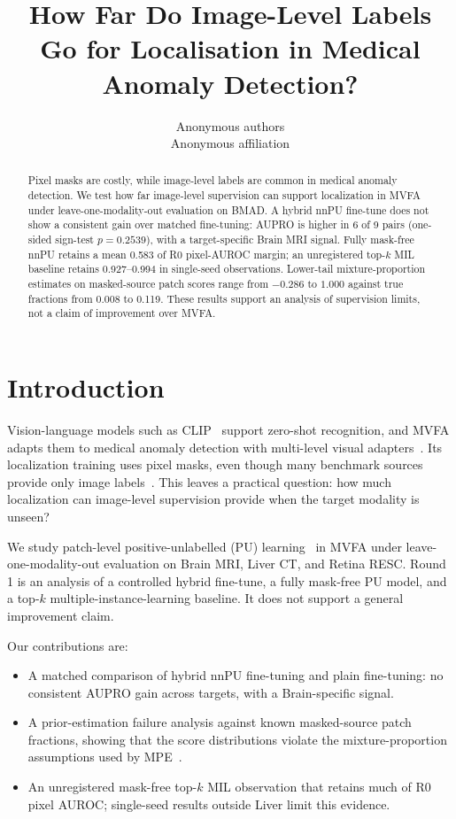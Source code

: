 \documentclass[10pt,twocolumn,letterpaper]{article}
\title{How Far Do Image-Level Labels Go for Localisation in Medical Anomaly Detection?}
\author{Anonymous authors\\Anonymous affiliation}
\begin{document}
\maketitle
\begin{abstract}
Pixel masks are costly, while image-level labels are common in medical anomaly detection. We test how far image-level supervision can support localization in MVFA under leave-one-modality-out evaluation on BMAD. A hybrid nnPU fine-tune does not show a consistent gain over matched fine-tuning: AUPRO is higher in 6 of 9 pairs (one-sided sign-test $p=0.2539$), with a target-specific Brain MRI signal. Fully mask-free nnPU retains a mean 0.583 of R0 pixel-AUROC margin; an unregistered top-$k$ MIL baseline retains 0.927--0.994 in single-seed observations. Lower-tail mixture-proportion estimates on masked-source patch scores range from $-0.286$ to $1.000$ against true fractions from 0.008 to 0.119. These results support an analysis of supervision limits, not a claim of improvement over MVFA.
\end{abstract}

\section{Introduction}
\label{sec:intro}
Vision-language models such as CLIP~\cite{clip2021} support zero-shot recognition, and MVFA adapts them to medical anomaly detection with multi-level visual adapters~\cite{huang2024mvfa}. Its localization training uses pixel masks, even though many benchmark sources provide only image labels~\cite{bmad2024}. This leaves a practical question: how much localization can image-level supervision provide when the target modality is unseen?

We study patch-level positive-unlabelled (PU) learning~\cite{elkan2008pu,kiryo2017nnpu} in MVFA under leave-one-modality-out evaluation on Brain MRI, Liver CT, and Retina RESC. Round 1 is an analysis of a controlled hybrid fine-tune, a fully mask-free PU model, and a top-$k$ multiple-instance-learning baseline. It does not support a general improvement claim.

Our contributions are:
\begin{itemize}
\item A matched comparison of hybrid nnPU fine-tuning and plain fine-tuning: no consistent AUPRO gain across targets, with a Brain-specific signal.
\item A prior-estimation failure analysis against known masked-source patch fractions, showing that the score distributions violate the mixture-proportion assumptions used by MPE~\cite{ramaswamy2016mpe}.
\item An unregistered mask-free top-$k$ MIL observation that retains much of R0 pixel AUROC; single-seed results outside Liver limit this evidence.
\end{itemize}
\end{document}
